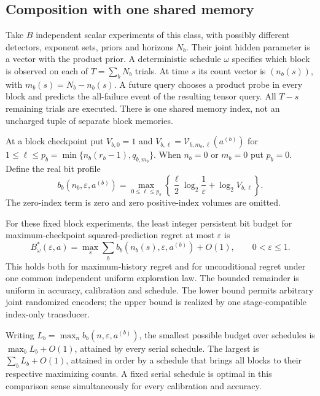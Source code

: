 \subsection{Composition with one shared memory}
Take $B$ independent scalar experiments of this class, with possibly
different detectors, exponent sets, priors and horizons $N_b$. Their
joint hidden parameter is a vector with the product prior. A deterministic
schedule $\omega$ specifies which block is observed on each of
$T=\sum_bN_b$ trials. At time $s$ its count vector is $(n_b(s))$,
with $m_b(s)=N_b-n_b(s)$. A future query chooses a product probe in
every block and predicts the all-failure event of the resulting tensor
query. All $T-s$ remaining trials are executed. There is one shared
memory index, not an uncharged tuple of separate block memories.

At a block checkpoint put $V_{b,0}=1$ and
$V_{b,\ell}=\mathcal V_{b,m_b,\ell}(a^{(b)})$ for
$1\le\ell\le p_b=\min\{n_b(r_b-1),q_{b,m_b}\}$. When $n_b=0$
or $m_b=0$ put $p_b=0$. Define the real bit profile
\[
 b_b(n_b,\varepsilon,a^{(b)})=
 \max_{0\le\ell\le p_b}
 \left\{\frac{\ell}{2}\log_2\frac1\varepsilon+\log_2V_{b,\ell}\right\}.
\]
The zero-index term is zero and zero positive-index volumes are omitted.

\begin{theorem}\label{thm:composition-main}
For these fixed block experiments, the least integer persistent bit budget
for maximum-checkpoint squared-prediction regret at most $\varepsilon$
is
\begin{equation}\label{eq:intro-shared-bits}
 B_\omega^*(\varepsilon,a)=
 \max_s\sum_b b_b(n_b(s),\varepsilon,a^{(b)})+O(1),
 \qquad 0<\varepsilon\le1.
\end{equation}
This holds both for maximum-history regret and for unconditional regret
under one common independent uniform exploration law. The bounded
remainder is uniform in accuracy, calibration and schedule. The lower
bound permits arbitrary joint randomized encoders; the upper bound is
realized by one stage-compatible index-only transducer.

Writing $L_b=\max_n b_b(n,\varepsilon,a^{(b)})$, the smallest
possible budget over schedules is $\max_bL_b+O(1)$, attained by every
serial schedule. The largest is $\sum_bL_b+O(1)$, attained in order
by a schedule that brings all blocks to their respective maximizing
counts. A fixed serial schedule is optimal in this comparison sense
simultaneously for every calibration and accuracy.
\end{theorem}

